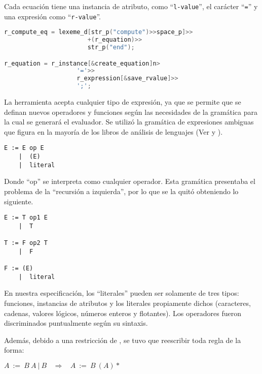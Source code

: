 Cada ecuación tiene una instancia de atributo, como ``\texttt{l-value}'', el carácter ``\texttt{=}'' y una expresión como ``\texttt{r-value}''.

\begin{lstlisting}[language=C++, basicstyle=\scriptsize, columns=fullflexible, linewidth=9cm]
r_compute_eq = lexeme_d[str_p("compute")>>space_p]>>
                       +(r_equation)>>
                       str_p("end");

r_equation = r_instance[&create_equation]n>
                    '='>>
                    r_expression[&save_rvalue]>>
                    ';';
\end{lstlisting}

La herramienta acepta cualquier tipo de expresión, ya que se permite que se definan nuevos operadores y funciones según las necesidades de la gramática para la cual se generará el evaluador. Se utilizó la gramática de expresiones ambiguas que figura en la mayoría de los libros de análisis de lenguajes (Ver \cite{gramatica} y \cite{compiladores}).

\begin{lstlisting}[backgroundcolor=\color{white}, columns=fullflexible, linewidth=7cm]
E := E op E
    |  (E)
    |  literal
\end{lstlisting}

Donde ``op'' se interpreta como cualquier operador. Esta gramática presentaba el problema de la ``recursión a izquierda'', por lo que se la quitó obteniendo lo siguiente.

\begin{lstlisting}[backgroundcolor=\color{white}, columns=fullflexible, linewidth=7cm]
E := T op1 E
    |  T

T := F op2 T
    |  F

F := (E)
    |  literal
\end{lstlisting}

En nuestra especificación, los ``literales'' pueden ser solamente de tres tipos: funciones, instancias de atributos y los literales propiamente dichos (caracteres, cadenas, valores lógicos, números enteros y flotantes). Los operadores fueron discriminados puntualmente según su sintaxis.

Además, debido a una restricción de \spirit, se tuvo que reescribir toda regla de la forma:

\begin{center}\textbf{\large{$A\ :=\ B\ A\ |\ B\ \ \ \ \Rightarrow\ \ \ \ A\ :=\ B\ (A)*$}}\end{center}

